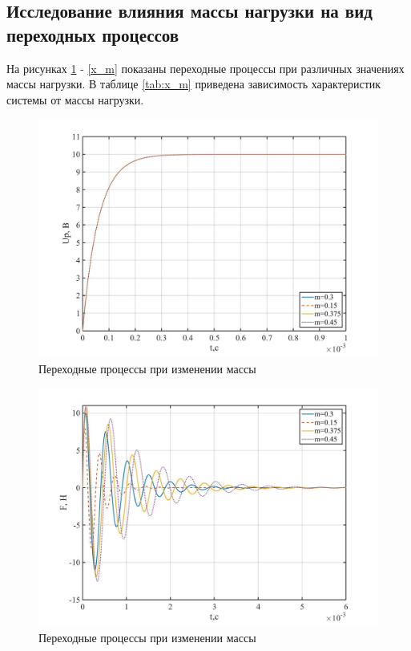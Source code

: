 \documentclass[a4paper, 12pt]{article}
\begin{document}
\newpage

\begin{center}
	\section{Исследование влияния массы нагрузки на вид переходных процессов}
\end{center}\par

На рисунках \ref{Up_m} - \ref{x_m} показаны переходные процессы при различных значениях массы нагрузки. В таблице \ref{tab:x_m} приведена зависимость  характеристик системы от массы нагрузки.

\begin{figure}[h!]
	\centering
	\includegraphics[width = 0.6\textheight]{data/Up_m}
	\caption{Переходные процессы при изменении массы}
	\label{Up_m}
\end{figure}

\newpage

\begin{figure}[h!]
	\centering
	\includegraphics[width = 0.6\textheight]{data/F_m}
	\caption{Переходные процессы при изменении массы}
	\label{F_m}
\end{figure}
\end{document}
